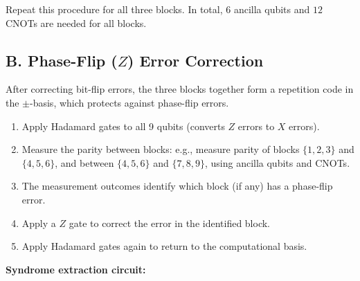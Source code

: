 \documentclass{book}
\begin{document}
Repeat this procedure for all three blocks. In total, $6$ ancilla qubits and $12$ CNOTs are needed for all blocks.

\subsection{B. Phase-Flip ($Z$) Error Correction}

After correcting bit-flip errors, the three blocks together form a repetition code in the $\pm$-basis, which protects against phase-flip errors.

\begin{enumerate}
    \item Apply Hadamard gates to all 9 qubits (converts $Z$ errors to $X$ errors).
    \item Measure the parity between blocks: e.g., measure parity of blocks $\{1,2,3\}$ and $\{4,5,6\}$, and between $\{4,5,6\}$ and $\{7,8,9\}$, using ancilla qubits and CNOTs.
    \item The measurement outcomes identify which block (if any) has a phase-flip error.
    \item Apply a $Z$ gate to correct the error in the identified block.
    \item Apply Hadamard gates again to return to the computational basis.
\end{enumerate}

\textbf{Syndrome extraction circuit:}

\begin{center}
\end{center}
\end{document}
